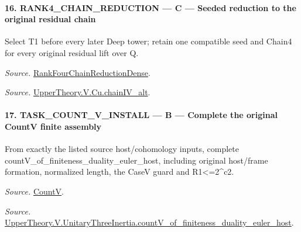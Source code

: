 \documentclass[11pt,a4paper]{article}
\numberwithin{equation}{section}
\theoremstyle{remark}\newtheorem{remark}[theorem]{Remark}
\begin{document}
\paragraph{16. RANK4\_\allowbreak CHAIN\_\allowbreak REDUCTION — C — Seeded reduction to the original residual chain}

Select T1 before every later Deep tower; retain one compatible seed and Chain4 for every original residual lift over Q.

\emph{Source.} \href{https://github.com/CocoSgt/riemann-hypothesis-lean/blob/7cbf7a0c32fca1badf05931879a37c3f8a2b03b4/src/Development/AutomorphicArithmetic/AutomorphicVarieties/ModularityArgument/ThresholdArguments/DenseThresholdCases/PromodularityCaseThree.lean#L33-L39}{RankFourChainReductionDense}.

\emph{Source.} \href{https://github.com/CocoSgt/riemann-hypothesis-lean/blob/7cbf7a0c32fca1badf05931879a37c3f8a2b03b4/src/Development/AutomorphicArithmetic/AutomorphicVarieties/ModularityArgument/ThresholdArguments/DenseThresholdCases/CuPChainIV.lean#L16-L82}{UpperTheory.V.Cu.chainIV\_\allowbreak alt}.



\paragraph{17. TASK\_\allowbreak COUNT\_\allowbreak V\_\allowbreak INSTALL — B — Complete the original CountV finite assembly}

From exactly the listed source host/cohomology inputs, complete countV\_\allowbreak of\_\allowbreak finiteness\_\allowbreak duality\_\allowbreak euler\_\allowbreak host, including original host/frame formation, normalized length, the CaseV guard and R1<=2\textasciicircum{}c2.

\emph{Source.} \href{https://github.com/CocoSgt/riemann-hypothesis-lean/blob/7cbf7a0c32fca1badf05931879a37c3f8a2b03b4/src/Development/AutomorphicArithmetic/AutomorphicVarieties/HeightAndVanishing/Counts.lean#L69-L69}{CountV}.

\emph{Source.} \href{https://github.com/CocoSgt/riemann-hypothesis-lean/blob/7cbf7a0c32fca1badf05931879a37c3f8a2b03b4/src/Development/AutomorphicArithmetic/AutomorphicVarieties/ModularityArgument/ThresholdArguments/DenseThresholdCases/CountVOf.lean#L33-L60}{UpperTheory.V.UnitaryThreeInertia.countV\_\allowbreak of\_\allowbreak finiteness\_\allowbreak duality\_\allowbreak euler\_\allowbreak host}.
\end{document}
